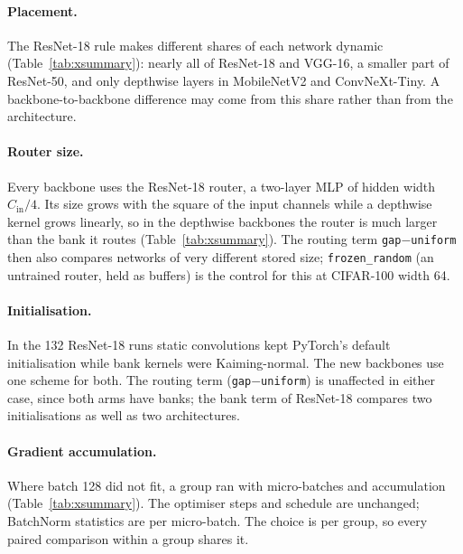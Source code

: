 \documentclass[10pt,a4paper]{article}
\begin{document}
\paragraph{Placement.} The ResNet-18 rule makes different shares of each
network dynamic (Table~\ref{tab:xsummary}): nearly all of ResNet-18 and
VGG-16, a smaller part of ResNet-50, and only depthwise layers in
MobileNetV2 and ConvNeXt-Tiny. A backbone-to-backbone difference may come
from this share rather than from the architecture.

\paragraph{Router size.} Every backbone uses the ResNet-18 router, a
two-layer MLP of hidden width $C_{\text{in}}/4$. Its size grows with the
square of the input channels while a depthwise kernel grows linearly, so
in the depthwise backbones the router is much larger than the bank it
routes (Table~\ref{tab:xsummary}). The routing term
\texttt{gap}$-$\texttt{uniform} then also compares networks of very
different stored size; \texttt{frozen\_random} (an untrained router,
held as buffers) is the control for this at CIFAR-100 width 64.

\paragraph{Initialisation.} In the 132 ResNet-18 runs static convolutions
kept PyTorch's default initialisation while bank kernels were
Kaiming-normal. The new backbones use one scheme for both. The routing
term (\texttt{gap}$-$\texttt{uniform}) is unaffected in either case,
since both arms have banks; the bank term of ResNet-18 compares two
initialisations as well as two architectures.

\paragraph{Gradient accumulation.} Where batch 128 did not fit, a group
ran with micro-batches and accumulation (Table~\ref{tab:xsummary}). The
optimiser steps and schedule are unchanged; BatchNorm statistics are per
micro-batch. The choice is per group, so every paired comparison within a
group shares it.
\end{document}
